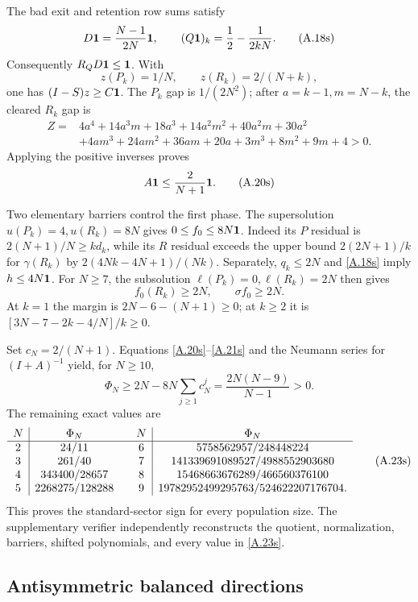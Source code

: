 The bad exit and retention row sums satisfy
\[
 D\mathbf 1={\frac{N-1}{2N}}\mathbf 1,\qquad
 (Q\mathbf 1)_k={\frac{1}{2}}-{\frac{1}{2kN}}.                         \tag{A.18s}\label{A.18s}
\]
Consequently $R_QD\mathbf 1\le\mathbf 1$.  With
\[
 z(P_k)=1/N,\qquad z(R_k)=2/(N+k),
\]
one has $(I-S)z\ge C\mathbf 1$.  The $P_k$ gap is $1/(2N^2)$;
after $a=k-1,m=N-k$, the cleared $R_k$ gap is
\[
\begin{aligned}
Z={}&4a^4+14a^3m+18a^3+14a^2m^2+40a^2m+30a^2\\
 &+4am^3+24am^2+36am+20a+3m^3+8m^2+9m+4>0.
\end{aligned}                                               \tag{A.19s}\label{A.19s}
\]
Applying the positive inverses proves
\[
 A\mathbf 1\le {\frac{2}{ N+1}}\mathbf 1.                              \tag{A.20s}\label{A.20s}
\]

Two elementary barriers control the first phase.  The supersolution
$u(P_k)=4,u(R_k)=8N$ gives $0\le f_0\le8N\mathbf 1$.  Indeed its
$P$ residual is $2(N+1)/N\ge kd_k$, while its $R$ residual exceeds the
upper bound $2(2N+1)/k$ for $\gamma(R_k)$ by
$2(4Nk-4N+1)/(Nk)$.  Separately, $q_k\le2N$ and
\eqref{A.18s} imply $h\le4N\mathbf 1$.  For $N\ge7$, the subsolution
$\ell(P_k)=0,\ell(R_k)=2N$ then gives
\[
 f_0(R_k)\ge2N,\qquad \sigma f_0\ge2N.                    \tag{A.21s}\label{A.21s}
\]
At $k=1$ the margin is $2N-6-(N+1)\ge0$; at $k\ge2$ it is
$[3N-7-2k-4/N]/k\ge0$.

Set $c_N=2/(N+1)$.  Equations \eqref{A.20s}--\eqref{A.21s} and the
Neumann series for $(I+A)^{-1}$ yield, for $N\ge10$,
\[
 \Phi_N\ge2N-8N\sum_{j\ge1}c_N^j
 ={\frac{2N(N-9)}{ N-1}}>0.                                   \tag{A.22s}\label{A.22s}
\]
The remaining exact values are
\[
\begin{array}{c|c@{\qquad}c|c}
N&\Phi_N&N&\Phi_N\\ \hline
2&24/11&6&5758562957/248448224\\
3&261/40&7&141339691089527/4988552903680\\
4&343400/28657&8&15468663676289/466560376100\\
5&2268275/128288&9&19782952499295763/524622207176704.
\end{array}                                                \tag{A.23s}\label{A.23s}
\]
This proves the standard-sector sign for every population size.  The supplementary
verifier independently reconstructs the quotient, normalization, barriers,
shifted polynomials, and every value in \eqref{A.23s}.

\subsection{Antisymmetric balanced directions}

